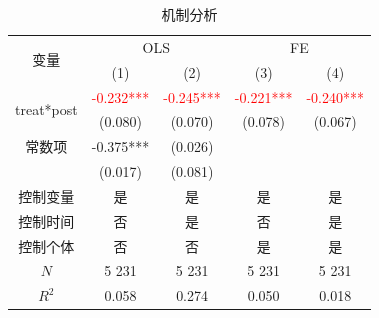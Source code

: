 \documentclass{beamer}	%
\theoremstyle{plain}
\theoremstyle{definition}
\theoremstyle{remark}
\numberwithin{equation}{section}
\begin{document}
\begin{frame}
\begin{table}[htbp]
\label{机制分析——表}
\tiny
\centering
\caption{机制分析}
\begin{tabular}{ccccc}
	\toprule
	    \multicolumn{1}{c}{\multirow{2}[4]{*}{变量}}     &                 \multicolumn{2}{c}{OLS}                 &   \multicolumn{2}{c}{FE}                             \\
	                  \cmidrule{2-5}              
	                       &            (1)             &            (2)             &            (3)             &            (4)             \\ \midrule
	\multicolumn{1}{c}{\multirow{2}[1]{*}{treat*post}} & \textcolor{red}{-0.232***} & \textcolor{red}{-0.245***} & \textcolor{red}{-0.221***} & \textcolor{red}{-0.240***} \\
	                                                   &          (0.080)           &          (0.070)           &          (0.078)           &          (0.067)           \\
	             \multicolumn{1}{c}{常数项}               &         -0.375***          &          (0.026)           &                            &                            \\
	                                                   &          (0.017)           &          (0.081)           &                            &                            \\
	             \multicolumn{1}{c}{控制变量}              &             是              &             是              &             是              &             是              \\
	             \multicolumn{1}{c}{控制时间}              &             否              &             是              &             否              &             是              \\
	             \multicolumn{1}{c}{控制个体}              &             否              &             否              &             是              &             是              \\
	                       $N$                         &           5 231            &           5 231            &           5 231            &           5 231            \\
	                      $R^2$                        &           0.058            &           0.274            &           0.050            &           0.018            \\ \bottomrule
\end{tabular}%
%
\end{table}%
\end{frame}
\end{document}
